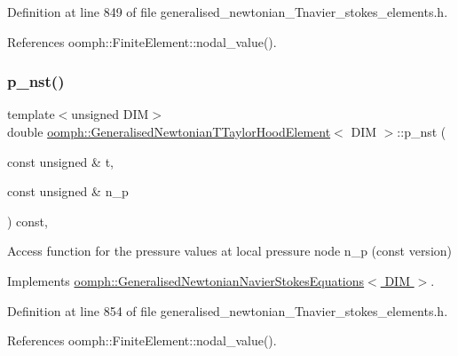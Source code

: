 Definition at line 849 of file generalised\+\_\+newtonian\+\_\+\+Tnavier\+\_\+stokes\+\_\+elements.\+h.



References oomph\+::\+Finite\+Element\+::nodal\+\_\+value().

\mbox{\label{classoomph_1_1GeneralisedNewtonianTTaylorHoodElement_a9d33cb4f837d7a231ff654acc2cd5f0f}} 
\subsubsection{\texorpdfstring{p\+\_\+nst()}{p\_nst()}\hspace{0.1cm}{\footnotesize\ttfamily [2/2]}}
{\footnotesize\ttfamily template$<$unsigned D\+IM$>$ \\
double \hyperlink{classoomph_1_1GeneralisedNewtonianTTaylorHoodElement}{oomph\+::\+Generalised\+Newtonian\+T\+Taylor\+Hood\+Element}$<$ D\+IM $>$\+::p\+\_\+nst (\begin{DoxyParamCaption}\item[{const unsigned \&}]{t,  }\item[{const unsigned \&}]{n\+\_\+p }\end{DoxyParamCaption}) const\hspace{0.3cm}{\ttfamily [inline]}, {\ttfamily [virtual]}}



Access function for the pressure values at local pressure node n\+\_\+p (const version) 



Implements \hyperlink{classoomph_1_1GeneralisedNewtonianNavierStokesEquations_a82eebde146ffb1b65a6c1ed8583c87f6}{oomph\+::\+Generalised\+Newtonian\+Navier\+Stokes\+Equations$<$ D\+I\+M $>$}.



Definition at line 854 of file generalised\+\_\+newtonian\+\_\+\+Tnavier\+\_\+stokes\+\_\+elements.\+h.



References oomph\+::\+Finite\+Element\+::nodal\+\_\+value().

\mbox{\label{classoomph_1_1GeneralisedNewtonianTTaylorHoodElement_a134794a357cd976138bc7036c9c3cb6f}} 
